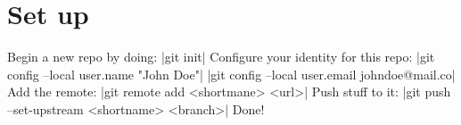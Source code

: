 \documentclass[10pt, a4paper]{article}
\begin{document}
\section*{Set up}

Begin a new repo by doing: |git init|
Configure your identity for this repo:
|git config --local user.name "John Doe"|
|git config --local user.email johndoe@mail.co|
Add the remote:
|git remote add <shortmane> <url>|
Push stuff to it:
|git push --set-upstream <shortname> <branch>|
Done!
\end{document}
